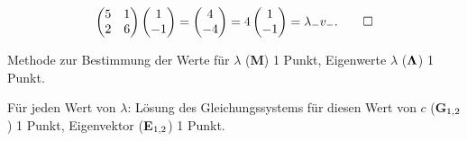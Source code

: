 \begin{loesung}
\begin{align*}
\begin{pmatrix}
5&1\\
2&6
\end{pmatrix}
\begin{pmatrix}1\\-1\end{pmatrix}
=
\begin{pmatrix}4\\-4\end{pmatrix}
=
4\begin{pmatrix}1\\-1\end{pmatrix}
=
\lambda_-v_-.
\qedhere
\end{align*}
\end{loesung}

\begin{bewertung}
\begin{teilaufgaben}
\item
Methode zur Bestimmung der Werte für $\lambda$ ({\bf M}) 1 Punkt,
Eigenwerte $\lambda$ ($\bf{\Lambda}$) 1 Punkt.
\item
Für jeden Wert von $\lambda$: Lösung des Gleichungssystems für diesen
Wert von $c$ 
({\bf G$\mathstrut_{1,2}$}) 1 Punkt, Eigenvektor ({\bf E$\mathstrut_{1,2}$})
1 Punkt.
\end{teilaufgaben}
\end{bewertung}

